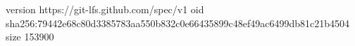 version https://git-lfs.github.com/spec/v1
oid sha256:79442e68c80d3385783aa550b832c0e66435899c48ef49ac6499db81c21b4504
size 153900
